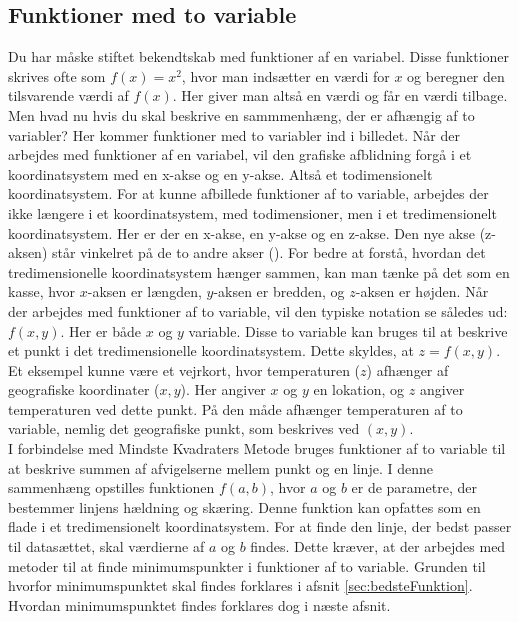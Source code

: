 \subsection{Funktioner med to variable}\label{sec:FunktionerMedToVariable}
Du har måske stiftet bekendtskab med funktioner af en variabel. Disse funktioner skrives ofte som $f(x) = x^2$, hvor man indsætter en værdi for $x$ og beregner den tilsvarende værdi af $f(x)$. Her giver man altså en værdi og får en værdi tilbage. Men hvad nu hvis du skal beskrive en sammmenhæng, der er afhængig af to variabler? Her kommer funktioner med to variabler ind i billedet. Når der arbejdes med funktioner af en variabel, vil den grafiske afblidning forgå i et koordinatsystem med en x-akse og en y-akse. Altså et todimensionelt koordinatsystem. For at kunne afbillede funktioner af to variable, arbejdes der ikke længere i et koordinatsystem, med todimensioner, men i et tredimensionelt koordinatsystem. Her er der en x-akse, en y-akse og en z-akse. Den nye akse (z-aksen) står vinkelret på de to andre akser (\cite[246-248]{funktionrAfToVariable}). For bedre at forstå, hvordan det tredimensionelle koordinatsystem hænger sammen, kan man tænke på det som en kasse, hvor  $x$-aksen er længden, $y$-aksen er bredden, og $z$-aksen er højden. Når der arbejdes med funktioner af to variable, vil den typiske notation se således ud: $f(x,y)$. Her er både $x$ og $y$ variable. Disse to variable kan bruges til at beskrive et punkt i det tredimensionelle koordinatsystem. Dette skyldes, at $z = f(x,y)$. Et eksempel kunne være et vejrkort, hvor temperaturen ($z$) afhænger af geografiske koordinater ($x, y$). Her angiver $x$ og $y$ en lokation, og $z$ angiver temperaturen ved dette punkt. På den måde afhænger temperaturen af to variable, nemlig det geografiske punkt, som beskrives ved $(x, y)$. \\
I forbindelse med Mindste Kvadraters Metode bruges funktioner af to variable til at beskrive summen af afvigelserne mellem punkt og en linje. I denne sammenhæng opstilles funktionen $f(a, b)$, hvor $a$ og $b$ er de parametre, der bestemmer linjens hældning og skæring. Denne funktion kan opfattes som en flade i et tredimensionelt koordinatsystem. 
For at finde den linje, der bedst passer til datasættet, skal værdierne af $a$ og $b$ findes. Dette kræver, at der arbejdes med metoder til at finde minimumspunkter i funktioner af to variable. Grunden til hvorfor minimumspunktet skal findes forklares i afsnit \ref{sec:bedsteFunktion}. Hvordan minimumspunktet findes forklares dog i næste afsnit.

